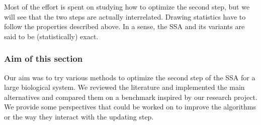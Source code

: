 Most of the effort is spent on studying how to optimize the second step, but we will see that the two steps are actually interrelated. Drawing statistics have to follow the properties described above. In a sense, the SSA and its variants are said to be (statistically) exact.

\subsubsection{Aim of this section}

Our aim was to try various methods to optimize the second step of the SSA for a large biological system. We reviewed the literature and implemented the main alternatives and compared them on a benchmark inspired by our research project. We provide some perspectives that could be worked on to improve the algorithms or the way they interact with the updating step.




